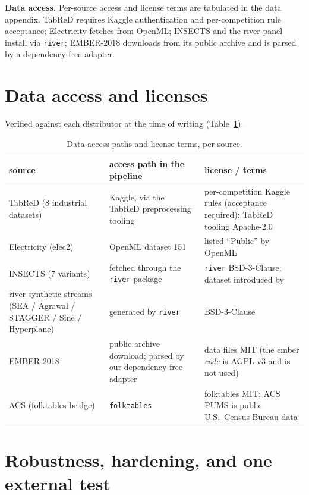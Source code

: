 \documentclass[10pt]{article} %
\begin{document}
\textbf{Data access.} Per-source access and license terms are tabulated in the data appendix. TabReD
requires Kaggle authentication and per-competition rule acceptance; Electricity fetches from
OpenML; INSECTS and the river panel install via \texttt{river}; EMBER-2018 downloads from its public
archive and is parsed by a dependency-free adapter.

\section{Data access and licenses}\label{app:licenses}

Verified against each distributor at the time of writing (Table~\ref{tab:licenses}).

\begin{table}[h]
\caption{Data access paths and license terms, per source.}
\label{tab:licenses}
\centering
\footnotesize
\begin{tabular}{@{}>{\raggedright\arraybackslash}p{1.75in}>{\raggedright\arraybackslash}p{2.05in}>{\raggedright\arraybackslash}p{2.35in}@{}}
\toprule
source & access path in the pipeline & license / terms \\
\midrule
TabReD (8 industrial datasets) & Kaggle, via the TabReD preprocessing tooling & per-competition Kaggle rules (acceptance required); TabReD tooling Apache-2.0 \\
Electricity (elec2) & OpenML dataset 151 & listed ``Public'' by OpenML \\
INSECTS (7 variants) & fetched through the \texttt{river} package & \texttt{river} BSD-3-Clause; dataset introduced by \citet{souza2020challenges} \\
river synthetic streams (SEA / Agrawal / STAGGER / Sine / Hyperplane) & generated by \texttt{river} & BSD-3-Clause \\
EMBER-2018 & public archive download; parsed by our dependency-free adapter & data files MIT (the ember \emph{code} is AGPL-v3 and is not used) \\
ACS (folktables bridge) & \texttt{folktables} & folktables MIT; ACS PUMS is public U.S.\ Census Bureau data \\
\bottomrule
\end{tabular}
\end{table}

\section{Robustness, hardening, and one external test}\label{app:rebuttal}
\end{document}
